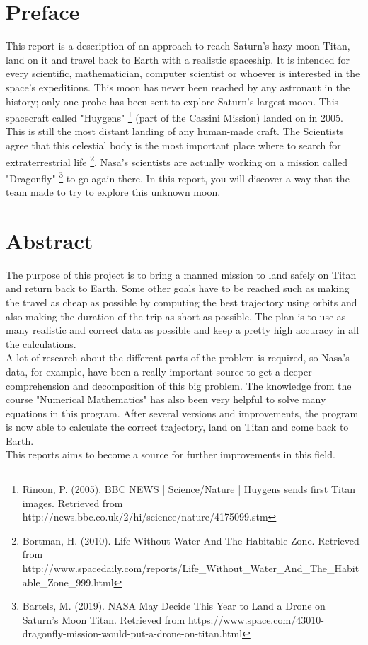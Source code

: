 \documentclass[10pt,a4paper]{article}
\begin{document}
	\section*{Preface}
	This report is a description of an approach to reach Saturn's hazy moon Titan, land on it and travel back to Earth with a realistic spaceship. It is intended for every scientific, mathematician, computer scientist or whoever is interested in the space's expeditions. This moon has never been reached by any astronaut in the history; only one probe has been sent to explore Saturn's largest moon. This spacecraft called "Huygens" \footnote{Rincon, P. (2005). BBC NEWS | Science/Nature | Huygens sends first Titan images. Retrieved from http://news.bbc.co.uk/2/hi/science/nature/4175099.stm} (part of the Cassini Mission) landed on in 2005. This is still the most distant landing of any human-made craft. The  Scientists agree that this celestial body is the most important place where to search for extraterrestrial life \footnote{Bortman, H. (2010). Life Without Water And The Habitable Zone. Retrieved from http://www.spacedaily.com/reports/Life\_Without\_Water\_And\_The\_Habitable\_Zone\_999.html}. Nasa's scientists are actually working on a mission called "Dragonfly" \footnote{Bartels, M. (2019). NASA May Decide This Year to Land a Drone on Saturn's Moon Titan. Retrieved from https://www.space.com/43010-dragonfly-mission-would-put-a-drone-on-titan.html} to go again there. In this report, you will discover a way that the team made to try to explore this unknown moon.
	
	\section*{Abstract}
	The purpose of this project is to bring a manned mission to land safely on Titan and return back to Earth. Some other goals have to be reached such as making the travel as cheap as possible by computing the best trajectory using orbits and also making the duration of the trip as short as possible. The plan is to use as many realistic and correct data as possible and keep a pretty high accuracy in all the calculations. \\
	A lot of research about the different parts of the problem is required, so Nasa's data, for example, have been a really important source to get a deeper comprehension and decomposition of this big problem. The knowledge from the course "Numerical Mathematics" has also been very helpful to solve many equations in this program. After several versions and improvements, the program is now able to calculate the correct trajectory, land on Titan and come back to Earth. \\
	This reports aims to become a source for further improvements in this field.
	
\end{document}
